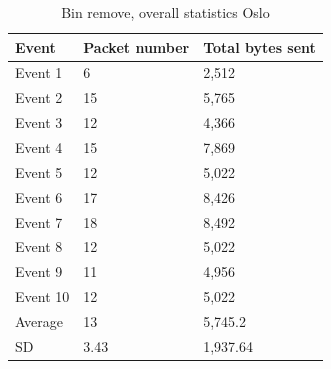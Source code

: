 \begin{table}[H]
\centering
\caption{Bin remove, overall statistics Oslo}
\label{tab:BRoverallOslo}
\begin{tabular}{|l|l|l|}
\hline
\textbf{Event} & \textbf{Packet number} & \textbf{Total bytes sent} \\ \hline
Event 1        & 6                      & 2,512                      \\ \hline
Event 2        & 15                     & 5,765                      \\ \hline
Event 3        & 12                     & 4,366                      \\ \hline
Event 4        & 15                     & 7,869                      \\ \hline
Event 5        & 12                     & 5,022                      \\ \hline
Event 6        & 17                     & 8,426                      \\ \hline
Event 7        & 18                     & 8,492                      \\ \hline
Event 8        & 12                     & 5,022                      \\ \hline
Event 9        & 11                     & 4,956                      \\ \hline
Event 10       & 12                     & 5,022                      \\ \hline
Average        & 13                     & 5,745.2                    \\ \hline
SD        & 3.43
       & 1,937.64               \\ \hline
\end{tabular}
\end{table}


